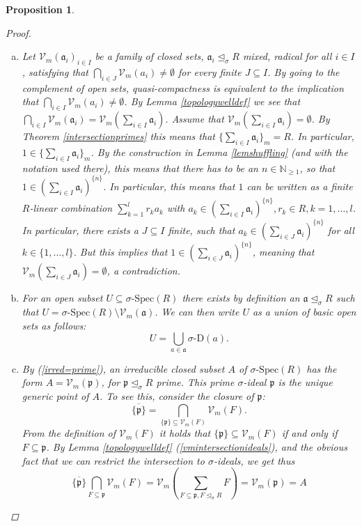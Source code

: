 \documentclass{article}
\def\NE{\mathbb{N}_{\geq1}}
\def\Vm{\mathcal{V}_m}
\def\V{\mathcal{V}}
\def\a{\mathfrak{a}}
\def\p{\mathfrak{p}}
\def\s{\sigma}
\def\si{\unlhd_{\sigma}}
\def\sSpec{\sigma\text{-Spec}}
\newenvironment{bew}{\begin{proof}[Proof]}{\end{proof}}
\theoremstyle{plain}
\newtheorem{prop}[Satz]{Proposition}
\theoremstyle{definition}
\begin{document}
\begin{prop}
\begin{bew}
\begin{enumerate}[(a)]
Now, by assumption, $\Vm(F)$ is irreducible, and thus it has to be that $\Vm(F) \subseteq \Vm(\{a\}_{m})$ or $\Vm(F) \subseteq \Vm(\{b\}_m)$. By the bijectivity of the mapping in (\ref{orderreversingbij}) this means that $a \in F$ or $b \in F$.
\item Let $\Vm(\a_i)_{i \in I}$ be a family of closed sets, $\a_i \si R$ mixed, radical for all $i \in I$, satisfying that 
$\bigcap_{i \in J} \Vm( a_i) \neq \emptyset$ for every finite $J \subseteq I$. By  going to the complement of open sets, quasi-compactness is equivalent to the implication that $\bigcap_{i \in I} \Vm(a_i) \neq \emptyset$.
By Lemma \ref{topologywelldef} we see that $\bigcap_{i \in I} \Vm( \a_i) = \Vm ( \sum_{i \in I} \a_i)$. Assume that $ \Vm ( \sum_{i \in I} \a_i) = \emptyset$. 
By Theorem \ref{intersectionprimes} this means that $\{ \sum_{i \in I} \a_i \}_m = R$. In particular, $1 \in \{ \sum_{i \in I} \a_i \}_m$. By the construction in Lemma \ref{lemshuffling} (and with the notation used there), this means that there has to be an $n \in \NE$,
so that $1 \in (\sum_{i \in I} \a_i )^{\{n\}}$. In particular, this means that $1$ can be written as a finite $R$-linear combination $\sum_{k=1}^l r_k a_k$ with $a_k \in (\sum_{i \in I} \a_i )^{\{n\}}, r_k \in R, k = 1,\ldots,l$. In particular, there exists a $J \subseteq I$ finite,
such that $a_k \in (\sum_{i \in J} \a_i )^{\{n\}}$ for all $k \in \{1, \ldots, l \}$. But this implies that $1 \in (\sum_{i \in J} \a_i)^{\{n\}}$, meaning that $\Vm(\sum_{i \in J} \a_i) = \emptyset$, a contradiction. 
\item For an open subset $U \subseteq \sSpec(R)$ there exists by definition an $\a \si R$ such that $U = \sSpec(R) \setminus \Vm(\a)$. We can then write $U$ as a union of basic open sets as follows: $$U = \bigcup_{a \in \a} \s\text{-D}(a).$$
\item By (\ref{irred=prime}), an irreducible closed subset $A$ of $\sSpec(R)$ has the form $A = \Vm(\p)$, for $\p \si R$ prime. This prime $\s$-ideal $\p$ is the unique generic point of $A$.
To see this, consider the closure of $\p$: $$\overline{\{\p\}} = \bigcap_{\{\p\} \subseteq \Vm(F)}\Vm(F).$$ From the definition of $\Vm(F)$ it holds that $\{\p\} \subseteq \V_m(F)$ if and only if $F \subseteq \p$. By Lemma \ref{topologywelldef} (\ref{vmintersectionideals}), and the obvious fact that we can restrict the intersection to $\s$-ideals, we get thus
\[ \overline{\{\p\}} \bigcap_{F \subseteq \p}\Vm(F) = \Vm(\sum_{F \subseteq \p, F \si R} F) = \Vm(\p) = A \]
\end{enumerate}
\end{bew}
\end{prop}
\end{document}
